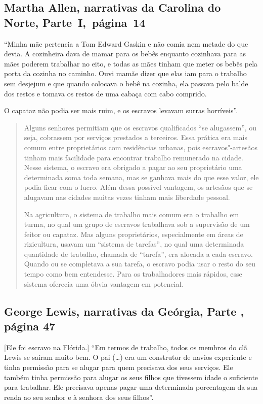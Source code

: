 \subsection{Martha Allen, narrativas da Carolina do Norte, Parte~I,~página~14} \label{ref06}

``Minha mãe pertencia a Tom Edward Gaskin e não comia nem metade do que
devia. A cozinheira dava de mamar para os bebês enquanto cozinhava para
as mães poderem trabalhar no eito, e todas as mães tinham que meter os
bebês pela porta da cozinha no caminho. Ouvi mamãe dizer que elas iam
para o trabalho sem desjejum e que quando colocava o bebê na cozinha,
ela passava pelo balde dos restos e tomava os restos de uma cabaça com
cabo comprido.

O capataz não podia ser mais ruim, e os escravos levavam surras
horríveis''.

\begin{quote}
Alguns senhores permitiam que os escravos qualificados ``se
alugassem'', ou seja, cobrassem por serviços prestados a terceiros. Essa
prática era mais comum entre proprietários com residências urbanas, pois
escravos"-artesãos tinham mais facilidade para encontrar trabalho
remunerado na cidade. Nesse sistema, o escravo era obrigado a pagar ao
seu proprietário uma determinada soma toda semana, mas se ganhava mais
do que esse valor, ele podia ficar com o lucro. Além dessa possível
vantagem, os artesãos que se alugavam nas cidades muitas vezes tinham
mais liberdade pessoal.

Na agricultura, o sistema de trabalho mais comum era o trabalho em
turma, no qual um grupo de escravos trabalhava sob a supervisão de um
feitor ou capataz. Mas alguns proprietários, especialmente em áreas de
rizicultura, usavam um ``sistema de tarefas'', no qual uma determinada
quantidade de trabalho, chamada de ``tarefa'', era alocada a cada
escravo. Quando ou se completava a sua tarefa, o escravo podia usar o
resto do seu tempo como bem entendesse. Para os trabalhadores mais
rápidos, esse sistema oferecia uma óbvia vantagem em potencial.
\end{quote}

\subsection{George Lewis, narrativas da Geórgia, Parte , página 47}
\label{ref171}

{[}Ele foi escravo na Flórida.{]} ``Em termos de trabalho, todos os
membros do clã Lewis se saíram muito bem. O pai (\ldots{}) era um
construtor de navios experiente e tinha permissão para se alugar para
quem precisava dos seus serviços. Ele também tinha permissão para alugar
os seus filhos que tivessem idade o suficiente para trabalhar. Ele
precisava apenas pagar uma determinada porcentagem da sua renda ao seu
senhor e à senhora dos seus filhos''.

